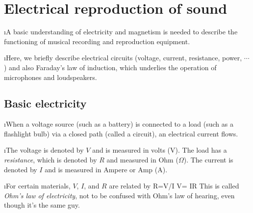 \section{Electrical reproduction of sound}

\bi
\i A basic understanding of electricity and magnetism is 
needed to describe the functioning of musical recording 
and reproduction equipment.

\i Here, we briefly describe electrical circuits (voltage, current,
resistance, power, $\cdots$) and also Faraday's law of induction, 
which underlies the operation of microphones and loudspeakers.

\ei

\subsection{Basic electricity}

\bi

\i When a voltage source (such as a battery) is connected to a 
load (such as a flashlight bulb) via a closed path (called a
circuit), an electrical current flows.

\i The voltage is denoted by $V$ and is measured in volts (V).
The load has a {\em resistance}, which is denoted by $R$ and 
measured in Ohm ($\Omega$).
The current is denoted by $I$ and is measured in Ampere or 
Amp (A).

\i For certain materials, $V$, $I$, and $R$ are related by 
%
\be
R=V/I\quad 
V= IR
\ee
%
This is called {\em Ohm's law of electricity}, not to be confused
with Ohm's law of hearing, even though it's the same guy.

